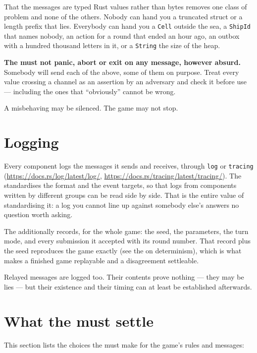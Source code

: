 \documentclass{article}
\begin{document}
That the messages are typed Rust values rather than bytes removes one class of problem and none of
the others. Nobody can hand you a truncated struct or a length prefix that lies. Everybody can hand
you a \texttt{Cell} outside the sea, a \texttt{ShipId} that names nobody, an action for a round
that ended an hour ago, an outbox with a hundred thousand letters in it, or a \texttt{String} the
size of the heap.

\textbf{The \admiralty{} must not panic, abort or exit on any message, however absurd.} Somebody
will send each of the above, some of them on purpose. Treat every value crossing a channel as an
assertion by an adversary and check it before use --- including the ones that ``obviously'' cannot
be wrong.

A misbehaving \ship{} may be silenced. The game may not stop.

\newpage
\section{Logging}
\label{proto:logging}

Every component logs the messages it sends and receives, through \texttt{log} or \texttt{tracing}
(\url{https://docs.rs/log/latest/log/}, \url{https://docs.rs/tracing/latest/tracing/}). The \WG{}
standardises the format and the event targets, so that logs from components written by different
groups can be read side by side. That is the entire value of standardising it: a log you cannot
line up against somebody else's answers no question worth asking.

The \admiralty{} additionally records, for the whole game: the seed, the parameters, the turn mode,
and every submission it accepted with its round number. That record plus the seed reproduces the
game exactly (see the \MD{} on determinism), which is what makes a finished game replayable and a
disagreement settleable.

Relayed messages are logged too. Their contents prove nothing --- they may be lies --- but their
existence and their timing can at least be established afterwards.

\newpage
\section{What the \WG{} must settle}
\label{proto:todo}

This section lists the choices the \WG{} must make for the game's rules and messages:
\end{document}
